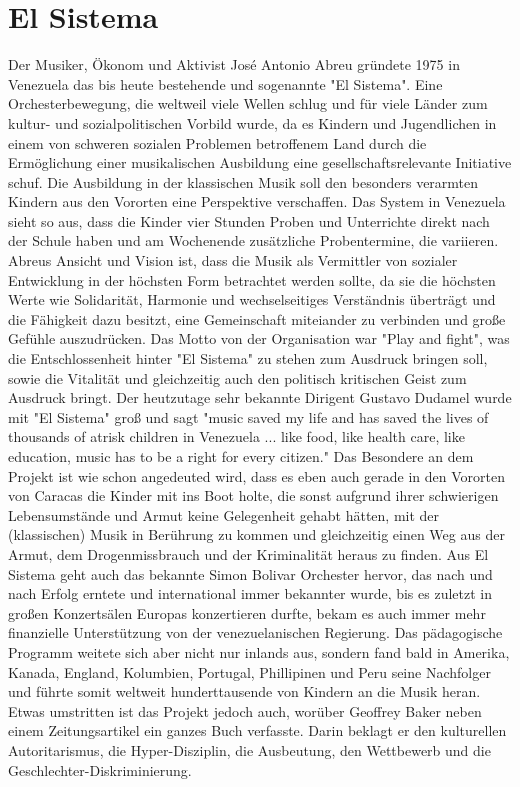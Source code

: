 \section{El Sistema}

Der Musiker, Ökonom und Aktivist José Antonio Abreu gründete 1975 in Venezuela
das bis heute bestehende und sogenannte "El Sistema". Eine Orchesterbewegung,
die weltweil viele Wellen schlug und für viele Länder zum kultur- und
sozialpolitischen Vorbild wurde, da es Kindern und Jugendlichen in einem von
schweren sozialen Problemen betroffenem Land durch die Ermöglichung einer
musikalischen Ausbildung eine gesellschaftsrelevante
Initiative schuf.
Die Ausbildung in der klassischen Musik soll den besonders verarmten Kindern aus den Vororten
eine Perspektive verschaffen. Das System in Venezuela sieht so aus, dass die
Kinder vier Stunden Proben und Unterrichte direkt nach der Schule haben und am
Wochenende zusätzliche Probentermine, die variieren. Abreus Ansicht und Vision ist, dass die
Musik als Vermittler von sozialer Entwicklung in der höchsten Form betrachtet
werden sollte, da sie die höchsten Werte wie Solidarität, Harmonie und
wechselseitiges Verständnis überträgt und die Fähigkeit dazu besitzt, eine
Gemeinschaft miteiander zu verbinden und große Gefühle auszudrücken. Das Motto
von der Organisation war "Play and fight", was die Entschlossenheit hinter "El
Sistema" zu stehen zum Ausdruck bringen soll, sowie die Vitalität und
gleichzeitig auch den politisch kritischen Geist zum Ausdruck bringt. Der
heutzutage sehr bekannte Dirigent Gustavo Dudamel wurde mit "El Sistema" groß
und sagt "music saved my life and has saved the lives of thousands of atrisk
children in Venezuela ... like food, like health care, like education, music has
to be a right for every citizen."%
Das Besondere an dem Projekt ist wie schon angedeuted wird, dass es eben auch
gerade in den Vororten von Caracas die Kinder mit ins Boot holte, die sonst
aufgrund ihrer schwierigen Lebensumstände und Armut keine Gelegenheit gehabt
hätten, mit der (klassischen) Musik in Berührung zu kommen und gleichzeitig
einen Weg aus der Armut, dem Drogenmissbrauch und der Kriminalität heraus zu
finden. Aus El Sistema geht auch das bekannte Simon Bolivar Orchester hervor,
das nach und nach Erfolg erntete und international
immer bekannter wurde, bis es zuletzt in großen Konzertsälen Europas
konzertieren durfte, bekam es auch immer mehr finanzielle Unterstützung von der
venezuelanischen Regierung. Das pädagogische Programm weitete sich aber nicht
nur inlands aus, sondern fand bald in Amerika, Kanada, England, Kolumbien,
Portugal, Phillipinen und Peru seine Nachfolger und führte somit weltweit
hunderttausende von Kindern an die Musik heran. Etwas umstritten ist das Projekt
jedoch auch, worüber Geoffrey Baker neben einem Zeitungsartikel ein ganzes
Buch verfasste. Darin beklagt er den kulturellen Autoritarismus, die
Hyper-Disziplin, die Ausbeutung, den Wettbewerb und die
Geschlechter-Diskriminierung. 


